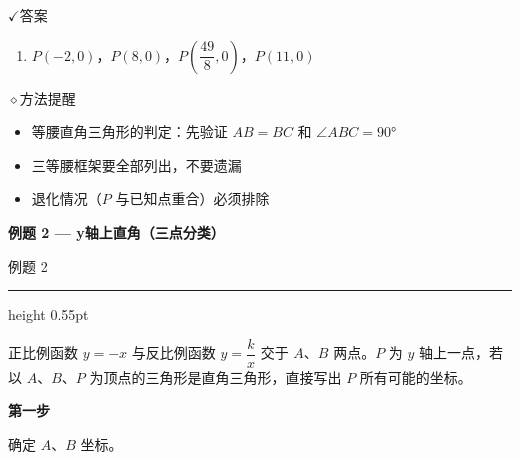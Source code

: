 \documentclass{exam-zh}
\newcommand{\eduSectionTitle}[1]{%
  \needspace{5\baselineskip}%
  \vspace{2mm}
  {\color{edu-blue}\bfseries\large #1}\par
  \vspace{3mm}
}
\newenvironment{eduSubQuestionItem}[1]{%
  \needspace{4\baselineskip}%
  \vspace{2mm}
  \par\noindent
  \hangindent=8mm\hangafter=1
  {\color{edu-blue}\bfseries #1}\enspace
  \begingroup
  \color{edu-ink}
}{%
  \endgroup
  \par
  \vspace{3mm}
}
\newcommand{\eduIconCheck}{\(\checkmark\)}
\newcommand{\eduIconPin}{\(\diamond\)}
\newenvironment{eduProblemBlock}[1][题目]{%
  \needspace{8\baselineskip}
  {\small\color{edu-muted}#1}\par
  \vspace{1.5mm}
  {\color{edu-blue}\hrule height 0.55pt}
  \vspace{4.5mm}
  \begingroup
  \color{edu-ink}
  \large
  \setlength{\parskip}{2.2mm}
  \linespread{1.20}\selectfont
}{%
  \par
  \endgroup
  \vspace{6mm}
}
\newenvironment{eduBulletList}{%
  \begin{itemize}[
    label=\textbullet,
    leftmargin=5mm,
    itemsep=1.2mm,
    topsep=0pt,
    parsep=0pt
  ]
}{%
  \end{itemize}
}
\newenvironment{eduBottomGrid}{%
  \vspace{1mm}
  \par\noindent
}{%
  \par\vspace{1mm}
}
\newenvironment{eduSummaryLeft}{%
  \begin{minipage}[t]{0.30\linewidth}
}{%
  \end{minipage}
}
\newcommand{\eduSummaryDivider}{%
  \hspace{4mm}{\color{edu-line}\vrule width 0.35pt}\hspace{7mm}%
}
\newenvironment{eduSummaryRight}{%
  \begin{minipage}[t]{0.58\linewidth}
}{%
  \end{minipage}
}
\newenvironment{eduPlainList}{%
  \begin{enumerate}[
    label=(\arabic*),
    leftmargin=7mm,
    itemsep=1.2mm,
    topsep=0pt,
    parsep=0pt
  ]
}{%
  \end{enumerate}
}
\begin{document}
\begin{eduBottomGrid}
  \begin{eduSummaryLeft}
    \begin{eduSummaryBlock}{\eduIconCheck}{答案}
    \begin{eduPlainList}
      \item $P(-2,0)$，$P(8,0)$，$P\left(\dfrac{49}{8}, 0\right)$，$P(11,0)$    \end{eduPlainList}
    \end{eduSummaryBlock}
  \end{eduSummaryLeft}
  \eduSummaryDivider
  \begin{eduSummaryRight}
    \begin{eduSummaryBlock}{\eduIconPin}{方法提醒}
    \begin{eduBulletList}
      \item 等腰直角三角形的判定：先验证 $AB=BC$ 和 $\angle ABC=90°$      \item 三等腰框架要全部列出，不要遗漏      \item 退化情况（$P$ 与已知点重合）必须排除    \end{eduBulletList}
    \end{eduSummaryBlock}
  \end{eduSummaryRight}
\end{eduBottomGrid}



\eduSectionTitle{例题 2 — y轴上直角（三点分类）}

\begin{eduProblemBlock}[例题 2]
正比例函数 $y=-x$ 与反比例函数 $y=\dfrac{k}{x}$ 交于 $A$、$B$ 两点。$P$ 为 $y$ 轴上一点，若以 $A$、$B$、$P$ 为顶点的三角形是直角三角形，直接写出 $P$ 所有可能的坐标。
\end{eduProblemBlock}





\begin{eduSubQuestionItem}{第一步}
确定 $A$、$B$ 坐标。\end{eduSubQuestionItem}
\end{document}
